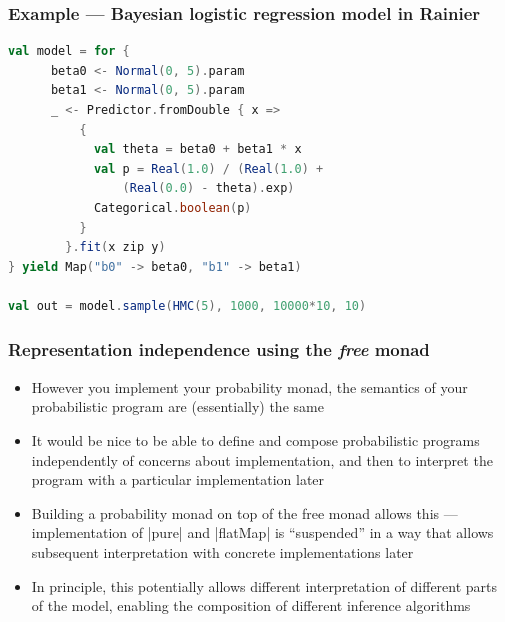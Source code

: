 \documentclass[mathserif,handout]{beamer}
\begin{document}
\begin{frame}[fragile]
\frametitle{Example --- Bayesian logistic regression model in Rainier}
\begin{lstlisting}[language=scala]
val model = for {
      beta0 <- Normal(0, 5).param
      beta1 <- Normal(0, 5).param
      _ <- Predictor.fromDouble { x =>
          {
            val theta = beta0 + beta1 * x
            val p = Real(1.0) / (Real(1.0) +
                (Real(0.0) - theta).exp)
            Categorical.boolean(p)
          }
        }.fit(x zip y)
} yield Map("b0" -> beta0, "b1" -> beta1)

val out = model.sample(HMC(5), 1000, 10000*10, 10)
\end{lstlisting}
\end{frame}

\begin{frame}[fragile]
  \frametitle{Representation independence using the \emph{free} monad}
  \begin{itemize}
  \item However you implement your probability monad, the semantics of your probabilistic program are (essentially) the same
  \item It would be nice to be able to define and compose probabilistic programs independently of concerns about implementation, and then to \alert{interpret} the program with a particular implementation later
  \item Building a probability monad on top of the \alert{free monad} allows this --- implementation of |pure| and |flatMap| is ``suspended'' in a way that allows subsequent interpretation with concrete implementations later
    \item In principle, this potentially allows different interpretation of different parts of the model, enabling the composition of different inference algorithms
    \end{itemize}
\end{frame}
\end{document}
